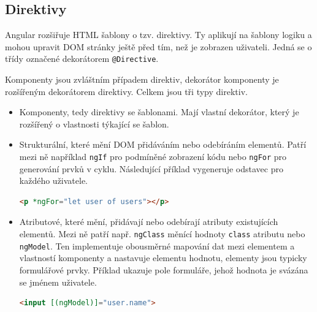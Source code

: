 \documentclass[
  digital, %
  oneside, %
  table,   %
  nolof,     %
  nolot,     %
]{fithesis3}
\begin{document}
\subsection{Direktivy}
Angular rozšiřuje HTML šablony o tzv. direktivy. Ty aplikují na šablony logiku a mohou upravit DOM stránky ještě před tím, než je zobrazen uživateli. Jedná se o třídy označené dekorátorem \verb|@Directive|.\par
Komponenty jsou zvláštním případem direktiv, dekorátor komponenty je rozšířeným dekorátorem direktivy. Celkem jsou tři typy direktiv. \cite{angulario}
\begin{itemize}
  \item Komponenty, tedy direktivy se šablonami. Mají vlastní dekorátor, který je rozšířený o vlastnosti týkající se šablon.
  \item Strukturální, které mění DOM přidáváním nebo odebíráním elementů. Patří mezi ně například \verb|ngIf| pro podmíněné zobrazení kódu nebo \verb|ngFor| pro generování prvků v cyklu. Následující příklad vygeneruje odstavec pro každého uživatele.
\begin{lstlisting}[showstringspaces=false,language=html]
<p *ngFor="let user of users"></p>
\end{lstlisting}
  \item Atributové, které mění, přidávají nebo odebírají atributy existujících elementů. Mezi ně patří např. \verb|ngClass| měnící hodnoty \verb|class| atributu nebo \verb|ngModel|. Ten implementuje obousměrné mapování dat mezi elementem a vlastností komponenty a nastavuje elementu hodnotu, elementy jsou typicky formulářové prvky. Příklad ukazuje pole formuláře, jehož hodnota je svázána se jménem uživatele.
\begin{lstlisting}[showstringspaces=false,language=html]
<input [(ngModel)]="user.name">
\end{lstlisting}
\end{itemize}
\end{document}
